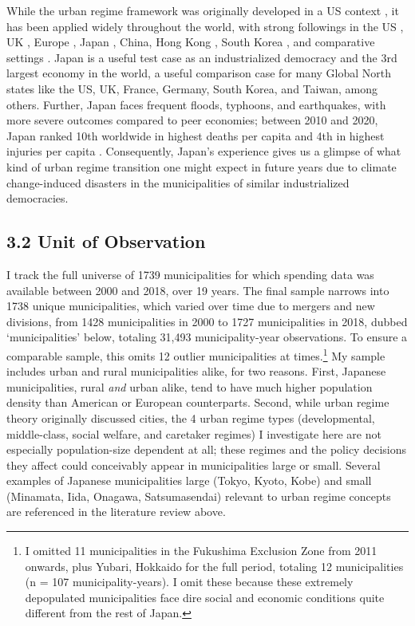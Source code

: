 \documentclass[preprint, 3p,
authoryear]{elsarticle} %
\begin{document}
While the urban regime framework was originally developed in a US
context \citep{stone_1989}, it has been applied widely throughout the
world, with strong followings in the US \citep{kilburn_2004}, UK
\citep{bassett_1996, davies_2017}, Europe
\citep{stoker_and_mossberger_1994, arbaci_2019}, Japan
\citep{hill_fujita_2000, saito_2003, sorensen_et_al_2010, tsukamoto_2012},
China, Hong Kong \citep{lai_and_chui_2014}, South Korea
\citep{shin_et_al_2015}, and comparative settings
\citep{mossberger_and_stoker_2001, ramirez_perez_et_al_2008}. Japan is a
useful test case as an industrialized democracy and the 3rd largest
economy in the world, a useful comparison case for many Global North
states like the US, UK, France, Germany, South Korea, and Taiwan, among
others. Further, Japan faces frequent floods, typhoons, and earthquakes,
with more severe outcomes compared to peer economies; between 2010 and
2020, Japan ranked 10th worldwide in highest deaths per capita and 4th
in highest injuries per capita \citep{ritchie_roser_2021}. Consequently,
Japan's experience gives us a glimpse of what kind of urban regime
transition one might expect in future years due to climate
change-induced disasters in the municipalities of similar industrialized
democracies.

\hypertarget{unit-of-observation}{%
\subsection{3.2 Unit of Observation}\label{unit-of-observation}}

I track the full universe of 1739 municipalities for which spending data
was available between 2000 and 2018, over 19 years. The final sample
narrows into 1738 unique municipalities, which varied over time due to
mergers and new divisions, from 1428 municipalities in 2000 to 1727
municipalities in 2018, dubbed `municipalities' below, totaling 31,493
municipality-year observations. To ensure a comparable sample, this
omits 12 outlier municipalities at times.\footnote{I omitted 11
  municipalities in the Fukushima Exclusion Zone from 2011 onwards, plus
  Yubari, Hokkaido for the full period, totaling 12 municipalities (n =
  107 municipality-years). I omit these because these extremely
  depopulated municipalities face dire social and economic conditions
  quite different from the rest of Japan.} My sample includes urban and
rural municipalities alike, for two reasons. First, Japanese
municipalities, rural \emph{and} urban alike, tend to have much higher
population density than American or European counterparts. Second, while
urban regime theory originally discussed cities, the 4 urban regime
types (developmental, middle-class, social welfare, and caretaker
regimes) I investigate here are not especially population-size dependent
at all; these regimes and the policy decisions they affect could
conceivably appear in municipalities large or small. Several examples of
Japanese municipalities large (Tokyo, Kyoto, Kobe) and small (Minamata,
Iida, Onagawa, Satsumasendai) relevant to urban regime concepts are
referenced in the literature review above.
\end{document}
